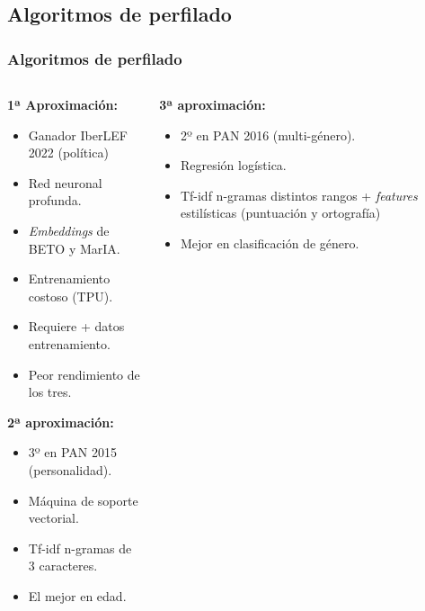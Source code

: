 \documentclass{beamer}
\begin{document}
		\subsection{Algoritmos de perfilado}
		\begin{frame}
			\frametitle{Algoritmos de perfilado}

			\begin{columns}[T]
				\hspace{-3cm}
				\begin{column}{0.8\textwidth}
					\begin{description}[labelwidth=0.01mm]
						\item \textbf{1ª Aproximación:} 
								\begin{itemize}
									\item Ganador IberLEF 2022 (política)
									\item Red neuronal profunda.
									\item \textit{Embeddings} de BETO y MarIA.
									\item Entrenamiento costoso (TPU).
									\item Requiere + datos entrenamiento.
									\item Peor rendimiento de los tres.

								\end{itemize}
						\vspace{0.8cm} \pause
						\item \textbf{2ª aproximación:} 
							\begin{itemize}
								\item 3º en PAN 2015 (personalidad).
								\item Máquina de soporte vectorial.
								\item Tf-idf n-gramas de 3 caracteres.
								\item El mejor en edad.
							\end{itemize}
					\end{description}
				\end{column}
				\hspace{-3.5cm}
				\begin{column}{0.8\textwidth}
					\begin{description}[labelwidth=0.01mm] \pause
						\item \textbf{3ª aproximación:} 
						\begin{itemize}
							\item 2º en PAN 2016 (multi-género).
							\item Regresión logística.
							\item Tf-idf n-gramas distintos rangos + \textit{features} estilísticas (puntuación y ortografía)
							\item Mejor en clasificación de género.
						\end{itemize}
						\vspace{0.35cm} 


\end{description}
\end{column}
\end{columns}
\end{frame}
\end{document}
